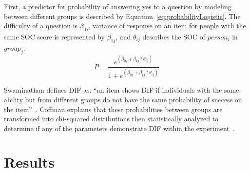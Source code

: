 \documentclass{sig-alternate}
\begin{document}
First, a predictor for probability of answering yes to a question by modeling between different groups is described by Equation~\ref{eq:probabilityLogistic}. The difficulty of a question is $\beta_{0j}$, variance of response on an item for people with the same SOC score is represented by $\beta_{1j}$, and $\theta_{ij}$ describes the SOC of $person_i$ in $group_j$.
\begin{equation}
\label{eq:probabilityLogistic}
P =  \frac{e^{(\beta_{0j} + \beta_{1j}*\theta_{ij})}}{1+e^{(\beta_{0j} + \beta_{1j}*\theta_{ij})}} 
\end{equation}

Swaminathan defines DIF as: ``an item shows DIF if individuals with the same ability but from different groups do not have the same probability of success on the item''~\cite{logisticDIF:1990}.
Coffman explains that these probabilities between groups are transformed into chi-squared distributions then statistically analyzed to determine if any of the parameters demonstrate DIF within the experiment~\cite{disparities:2009}.



\section{Results}
\label{sec:results}
\end{document}
